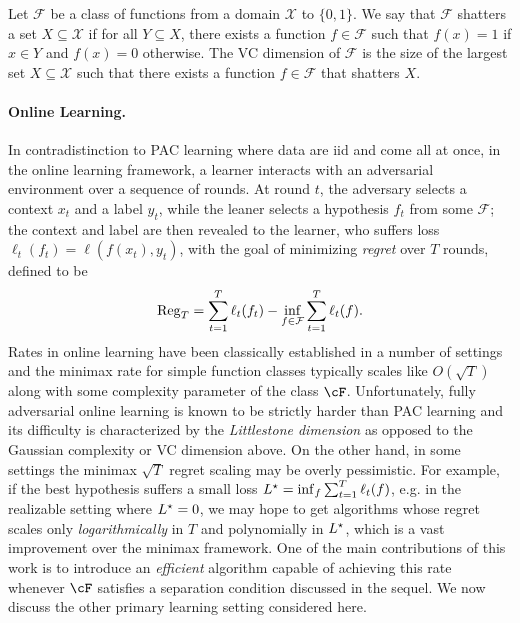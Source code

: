 \begin{definition}[VC Dimension] 
    Let $\mathcal{F}$ be a class of functions from a domain $\mathcal{X}$ to $\{0, 1\}$. 
    We say that $\mathcal{F}$ shatters a set $X \subseteq \mathcal{X}$ if for all $Y \subseteq X$, there exists a function $f \in \mathcal{F}$ such that $f(x) = 1$ if $x \in Y$ and $f(x) = 0$ otherwise.
    The VC dimension of $\mathcal{F}$ is the size of the largest set $X \subseteq \mathcal{X}$ such that there exists a function $f \in \mathcal{F}$ that shatters $X$.
\end{definition}

\paragraph{Online Learning.}
In contradistinction to PAC learning where data are iid and come all at once, in the online learning framework, a learner interacts with an adversarial environment over a sequence of rounds. At round \(t\), the adversary selects a context $x_t$ and a label $y_t$, while the leaner selects a hypothesis \(f_t\) from  some \(\mathcal{F}\); the context and label are then revealed to the learner, who suffers loss $\ell_t(f_t) = \ell(f(x_t), y_t)$, with the goal of minimizing \emph{regret} over $T$ rounds, defined to be
\begin{align}\label{eq:regret_def}
    \operatorname{Reg}_T = \sum_{t=1}^T \ell_t(f_t) - \inf_{f \in \mathcal{F}} \sum_{t=1}^T \ell_t(f).
\end{align}
Rates in online learning have been classically established in a number of settings \citep{ben2009agnostic,rakhlin2011online,rakhlin2015sequential} and the minimax rate for simple function classes typically scales like $O(\sqrt{T})$ along with some complexity parameter of the class $\cF$.  Unfortunately, fully adversarial online learning is known to be strictly harder than PAC learning and its difficulty is characterized by the \emph{Littlestone dimension} \citep{littlestone1988learning,ben2009agnostic} as opposed to the Gaussian complexity or VC dimension above.   On the other hand, in some settings the minimax $\sqrt{T}$ regret scaling may be overly pessimistic.  For example, if the best hypothesis suffers a small loss $L^\star = \inf_f \sum_{t = 1}^T \ell_t(f)$, e.g. in the realizable setting where $L^\star=0$, we may hope to get algorithms whose regret scales only \emph{logarithmically} in $T$ and polynomially in $L^\star$, which is a vast improvement over the minimax framework.  One of the main contributions of this work is to introduce an \emph{efficient} algorithm capable of achieving this rate whenever $\cF$ satisfies a separation condition discussed in the sequel.  We now discuss the other primary learning setting considered here.


